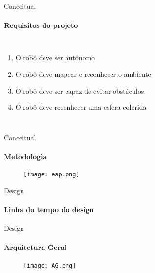 \begin{frame}[t]{Conceitual} 
    \framesubtitle{Requisitos do projeto}
        \begin{columns}[t]
                \begin{enumerate}
                    \item O robô deve ser autônomo
                    \item O robô deve mapear e reconhecer o ambiente
                    \item O robô deve ser capaz de evitar obstáculos
                    \item O robô deve reconhecer uma esfera colorida
                \end{enumerate}
            \begin{center}
                \begin{figure}
                \end{figure}
            \end{center}
        \end{columns}
\end{frame}
\begin{frame}[t]{Conceitual}
    \framesubtitle{Metodologia}
    \begin{figure}
        \texttt{[image: eap.png]}
    \end{figure}
\end{frame}
\begin{frame}[t]{Design}
    \framesubtitle{Linha do tempo do design}
    \begin{figure}
    \end{figure}
\end{frame}

\begin{frame}[t]{Design}
    \framesubtitle{Arquitetura Geral}
    \begin{figure}
        \texttt{[image: AG.png]}
    \end{figure}
\end{frame}

